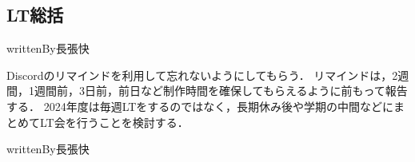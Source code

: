 \subsection*{LT総括}

writtenBy{\kensuiChief}{長張}{快}

Discordのリマインドを利用して忘れないようにしてもらう．
リマインドは，2週間，1週間前，3日前，前日など制作時間を確保してもらえるように前もって報告する．
2024年度は毎週LTをするのではなく，長期休み後や学期の中間などにまとめてLT会を行うことを検討する．

writtenBy{\kensuiStaff}{長張}{快}
